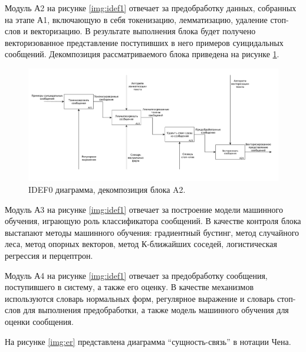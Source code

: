 Модуль А2 на рисунке \ref{img:idef1} отвечает за предобработку данных, собранных на этапе А1, включающую в себя токенизацию, лемматизацию, удаление стоп-слов и векторизацию.
В результате выполнения блока будет получено векторизованное представление поступивших в него примеров суицидальных сообщений. 
Декомпозиция рассматриваемого блока приведена на рисунке \ref{img:idef21}.

\begin{figure}[H]
	\centering
	\includegraphics[width=\textwidth]{inc/A21.pdf}
	\caption{ IDEF0 диаграмма, декомпозиция блока A2. }
	\label{img:idef21}
\end{figure}

Модуль А3 на рисунке \ref{img:idef1} отвечает за построение модели машинного обучения, играющую роль классификатора сообщений. 
В качестве контроля блока выстапают методы машинного обучения: градиентный бустинг, метод случайного леса, метод опорных векторов, метод К-ближайших соседей, логистическая регрессия и перцептрон.

Модуль А4 на рисунке \ref{img:idef1} отвечает за предобработку сообщения, поступившего в систему, а также его оценку. В качестве механизмов используются словарь нормальных форм, регулярное выражение и словарь стоп-слов для выполнения предобработки, а также модель машинного обучения для оценки сообщения.

На рисунке \ref{img:er} представлена диаграмма ``сущность-связь'' в нотации Чена.

